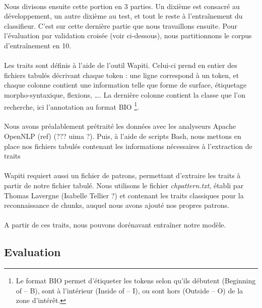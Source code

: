 \documentclass[a4paper,12pt]{article}
\begin{document}
\paragraph{}
Nous divisons ensuite cette portion en 3 parties. Un dixième est consacré au développement, un autre dixième au test, et tout le reste à l'entraînement du classifieur. C'est sur cette dernière partie que nous travaillons ensuite. Pour l'évaluation par validation croisée (voir ci-dessous), nous partitionnons le corpus d'entraînement en 10.

\paragraph{}
Les traits sont définis à l'aide de l'outil Wapiti. Celui-ci prend en entier des fichiers tabulés décrivant chaque token : une ligne correspond à un token, et chaque colonne contient une information telle que forme de surface, étiquetage morpho-syntaxique, flexions, \ldots. La dernière colonne contient la classe que l'on recherche, ici l'annotation au format BIO \footnote{Le format BIO permet d'étiqueter les tokens selon qu'ils débutent (Beginning of -- B), sont à l'intérieur (Inside of -- I), ou sont hors (Outside -- O) de la zone d'intérêt.}.

\paragraph{}
Nous avons préalablement prétraité les données avec les analyseurs Apache OpenNLP (ref) (??? uima ?). Puis, à l'aide de scripts Bash, nous mettons en place nos fichiers tabulés contenant les informations nécessaires à l'extraction de traits

\paragraph{}
Wapiti requiert aussi un fichier de patrons, permettant d'extraire les traits à partir de notre fichier tabulé. Nous utilisons le fichier \emph{chpattern.txt}, établi par Thomas Lavergne (Isabelle Tellier ?) et contenant les traits classiques pour la reconnaissance de chunks, auquel nous avons ajouté nos propres patrons.

\paragraph{}
A partir de ces traits, nous pouvons dorénavant entraîner notre modèle.

\subsection{Evaluation}
\end{document}
